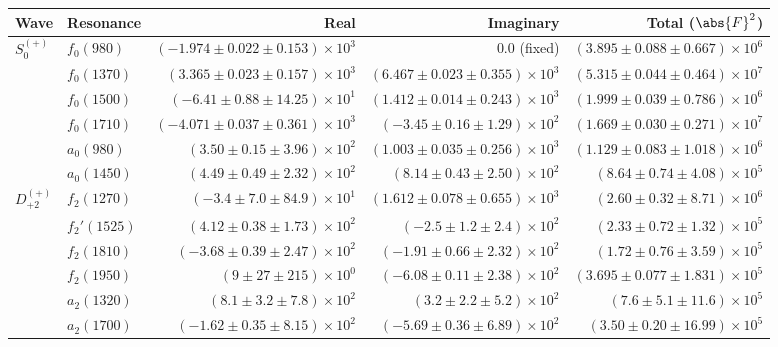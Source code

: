 \begin{table}[ht]
    \begin{center}
        \begin{tabular}{llrrr}\toprule
        Wave & Resonance & Real & Imaginary & Total ($\abs{F}^2$) \\\midrule
$S_{0}^{(+)}$ & $f_{0}(980)$ & $(-1.974 \pm 0.022 \pm 0.153) \times 10^{3}$ & $0.0$ (fixed) & $(3.895 \pm 0.088 \pm 0.667) \times 10^{6}$ \\
 & $f_{0}(1370)$ & $(3.365 \pm 0.023 \pm 0.157) \times 10^{3}$ & $(6.467 \pm 0.023 \pm 0.355) \times 10^{3}$ & $(5.315 \pm 0.044 \pm 0.464) \times 10^{7}$ \\
 & $f_{0}(1500)$ & $(-6.41 \pm 0.88 \pm 14.25) \times 10^{1}$ & $(1.412 \pm 0.014 \pm 0.243) \times 10^{3}$ & $(1.999 \pm 0.039 \pm 0.786) \times 10^{6}$ \\
 & $f_{0}(1710)$ & $(-4.071 \pm 0.037 \pm 0.361) \times 10^{3}$ & $(-3.45 \pm 0.16 \pm 1.29) \times 10^{2}$ & $(1.669 \pm 0.030 \pm 0.271) \times 10^{7}$ \\
 & $a_{0}(980)$ & $(3.50 \pm 0.15 \pm 3.96) \times 10^{2}$ & $(1.003 \pm 0.035 \pm 0.256) \times 10^{3}$ & $(1.129 \pm 0.083 \pm 1.018) \times 10^{6}$ \\
 & $a_{0}(1450)$ & $(4.49 \pm 0.49 \pm 2.32) \times 10^{2}$ & $(8.14 \pm 0.43 \pm 2.50) \times 10^{2}$ & $(8.64 \pm 0.74 \pm 4.08) \times 10^{5}$ \\
$D_{+2}^{(+)}$ & $f_{2}(1270)$ & $(-3.4 \pm 7.0 \pm 84.9) \times 10^{1}$ & $(1.612 \pm 0.078 \pm 0.655) \times 10^{3}$ & $(2.60 \pm 0.32 \pm 8.71) \times 10^{6}$ \\
 & $f_{2}'(1525)$ & $(4.12 \pm 0.38 \pm 1.73) \times 10^{2}$ & $(-2.5 \pm 1.2 \pm 2.4) \times 10^{2}$ & $(2.33 \pm 0.72 \pm 1.32) \times 10^{5}$ \\
 & $f_{2}(1810)$ & $(-3.68 \pm 0.39 \pm 2.47) \times 10^{2}$ & $(-1.91 \pm 0.66 \pm 2.32) \times 10^{2}$ & $(1.72 \pm 0.76 \pm 3.59) \times 10^{5}$ \\
 & $f_{2}(1950)$ & $(9 \pm 27 \pm 215) \times 10^{0}$ & $(-6.08 \pm 0.11 \pm 2.38) \times 10^{2}$ & $(3.695 \pm 0.077 \pm 1.831) \times 10^{5}$ \\
 & $a_{2}(1320)$ & $(8.1 \pm 3.2 \pm 7.8) \times 10^{2}$ & $(3.2 \pm 2.2 \pm 5.2) \times 10^{2}$ & $(7.6 \pm 5.1 \pm 11.6) \times 10^{5}$ \\
 & $a_{2}(1700)$ & $(-1.62 \pm 0.35 \pm 8.15) \times 10^{2}$ & $(-5.69 \pm 0.36 \pm 6.89) \times 10^{2}$ & $(3.50 \pm 0.20 \pm 16.99) \times 10^{5}$ \\

\end{tabular}
\end{center}
\end{table}

